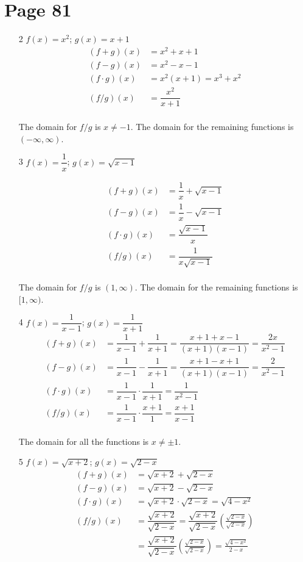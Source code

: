 \documentclass[fleqn,addpoints]{exam}
\begin{document}
\section{Page 81}
\begin{itemize}
\item[2]
$f(x) = x^2$; $g(x) = x+1$
\begin{align*}
  (f+g)(x) &= x^2 + x + 1 \\
  (f-g)(x) &= x^2 - x - 1 \\
  (f \cdot g)(x) &= x^2(x+1) = x^3 + x^2 \\
  (f/g)(x) &= \dfrac{x^2}{x+1} \\
\end{align*}

The domain for $f/g$ is $x \neq -1$.  The domain for the remaining functions is $(-\infty, \infty)$.

\item[3]
$f(x) = \dfrac{1}{x}$; $g(x) = \sqrt{x-1}$

\begin{align*}
  (f+g)(x) &= \dfrac{1}{x} + \sqrt{x-1} \\
  (f-g)(x) &= \dfrac{1}{x} - \sqrt{x-1} \\
  (f \cdot g)(x) &= \dfrac{\sqrt{x-1}}{x} \\
  (f/g)(x) &= \dfrac{1}{x\sqrt{x-1}} \\
\end{align*}

The domain for $f/g$ is $(1, \infty)$.  The domain for the remaining functions is $[1, \infty)$.

\item[4]
$f(x) = \dfrac{1}{x-1}$; $g(x) = \dfrac{1}{x+1}$
\begin{align*}
  (f+g)(x) &= \dfrac{1}{x-1} + \dfrac{1}{x+1} = \dfrac{x+1+x-1}{(x+1)(x-1)} = \dfrac{2x}{x^2-1} \\
  (f-g)(x) &= \dfrac{1}{x-1} - \dfrac{1}{x+1} = \dfrac{x+1 - x + 1}{(x+1)(x-1)} = \dfrac{2}{x^2-1} \\
  (f \cdot g)(x) &= \dfrac{1}{x-1} \cdot \dfrac{1}{x+1} = \dfrac{1}{x^2-1} \\
  (f/g)(x) &= \dfrac{1}{x-1} \cdot \dfrac{x+1}{1} = \dfrac{x+1}{x-1} \\
\end{align*}

The domain for all the functions is $x \neq \pm 1$.

\item[5]
$f(x) = \sqrt{x+2}$; $g(x) = \sqrt{2-x}$
\begin{align*}
  (f+g)(x) &= \sqrt{x+2} + \sqrt{2-x} \\
  (f-g)(x) &= \sqrt{x+2} - \sqrt{2-x} \\
  (f \cdot g)(x) &= \sqrt{x+2} \cdot \sqrt{2-x} = \sqrt{4-x^2} \\
  (f/g)(x) &= \dfrac{\sqrt{x+2}}{\sqrt{2-x}} = \dfrac{\sqrt{x+2}}{\sqrt{2-x}} \left( \frac{\sqrt{2-x}}{\sqrt{2-x}} \right) \\
           &= \dfrac{\sqrt{x+2}}{\sqrt{2-x}} \left( \frac{\sqrt{2-x}}{\sqrt{2-x}} \right) = \frac{\sqrt{4-x^2}}{2-x}  \\
\end{align*}


\end{itemize}
\end{document}
